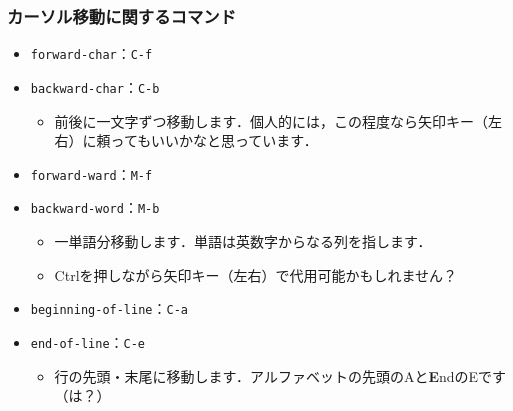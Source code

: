 \subsubsection{カーソル移動に関するコマンド}
\begin{itemize}
\item \texttt{forward-char}：\texttt{C-f}
\item \texttt{backward-char}：\texttt{C-b}
  \begin{itemize}
  \item 前後に一文字ずつ移動します．個人的には，この程度なら矢印キー（左右）に頼ってもいいかなと思っています．
  \end{itemize}
\item \texttt{forward-ward}：\texttt{M-f}
\item \texttt{backward-word}：\texttt{M-b}
  \begin{itemize}
  \item 一単語分移動します．単語は英数字からなる列を指します．
  \item Ctrlを押しながら矢印キー（左右）で代用可能かもしれません？
  \end{itemize}
\item \texttt{beginning-of-line}：\texttt{C-a}
\item \texttt{end-of-line}：\texttt{C-e}
  \begin{itemize}
  \item 行の先頭・末尾に移動します．アルファベットの先頭のAと\textbf{E}ndのEです（は？）
  \end{itemize}
\end{itemize}
